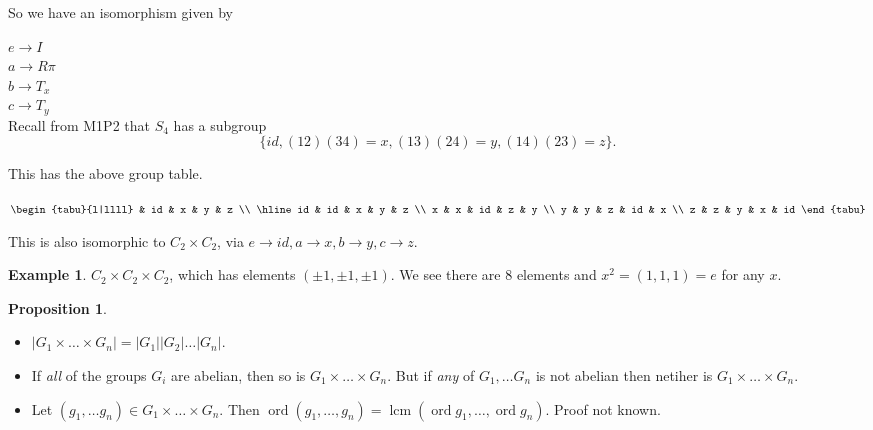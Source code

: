 \documentclass{article}
\theoremstyle{definition}
\newtheorem{proposition}[theorem]{Proposition}
\newtheorem*{exmp}{Example}
\DeclareMathOperator{\lcm}{lcm}
\DeclareMathOperator{\ord}{\text{ord}}
\begin{document}
So we have an isomorphism given by

$e \rightarrow I$\\
$a \rightarrow R\pi$\\
$b \rightarrow T_x$\\
$c \rightarrow T_y$\\

Recall from M1P2 that $S_4$ has a subgroup $$\{id,  (12)(34)=x, (13)(24)=y, (14)(23)=z\}.$$

This has the above group table.
\begin{table}[!ht]
\centering
$\begin{tabu}{l|llll}
   & id & x  & y  & z \\
   \hline
id & id & x  & y  & z \\
x  & x  & id & z  & y \\
y  & y  & z  & id & x \\
z  & z  & y  & x  & id 
\end{tabu}$
\end{table}

This is also isomorphic to $C_2 \times C_2$, via $e \rightarrow id, a \rightarrow x, b \rightarrow y, c \rightarrow z$.\\

\begin{exmp}
  
$C_2 \times C_2 \times C_2$, which has elements $(\pm 1, \pm 1, \pm 1)$. We see there are 8 elements and $x^2=(1,1,1)=e$ for any $x$.\\
\end{exmp}

\begin{proposition}\hfill
  \label{prp:ordgroup}
\begin{itemize}
  \item $|G_1 \times \ldots \times G_n| =|G_1||G_2|\ldots|G_n|.$
\item If \emph{all} of the groups $G_i$ are abelian, then so is $G_1 \times \ldots \times G_n$. But if \emph{any} of $G_1, \ldots G_n$ is not abelian then netiher is $G_1 \times \ldots \times G_n$.
\item Let $(g_1, \ldots g_n) \in G_1 \times \ldots \times G_n$. Then $\ord (g_1, \ldots , g_n) = \lcm (\ord g_1, \ldots , \ord g_n)$.
Proof not known.
\end{itemize}
\end{proposition}
\end{document}
